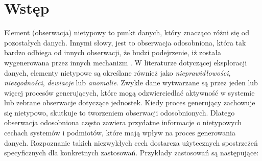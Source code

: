 \documentclass[12pt,a4paper,oneside]{book}
\theoremstyle{definition}
\begin{document}
\section{Wstęp}

Element (obserwacja) nietypowy  to punkt danych, który znacząco różni się od pozostałych danych. Innymi słowy, jest to obserwacja odosobniona, która tak bardzo odbiega od innych obserwacji, że budzi podejrzenie, iż została wygenerowana przez innych mechanizm \cite{Hawkins_1980}. W literaturze dotyczącej eksploracji danych, elementy nietypowe są określane również jako \textit{nieprawidłowości}, \textit{niezgodności}, \textit{dewiacje} lub \textit{anomalie}. Zwykle dane wytwarzane są przez jeden lub więcej procesów generujących, które mogą odzwierciedlać aktywność w systemie lub zebrane obserwacje dotyczące jednostek. Kiedy proces generujący zachowuje się nietypowo, skutkuje to tworzeniem obserwacji odosobnionych. Dlatego obserwacja odosobniona często zawiera przydatne informacje o nietypowych cechach systemów i podmiotów, które mają wpływ na proces generowania danych. Rozpoznanie takich niezwykłych cech dostarcza użytecznych spostrzeżeń specyficznych dla konkretnych zastosowań. Przykłady zastosowań są następujące:
\end{document}
